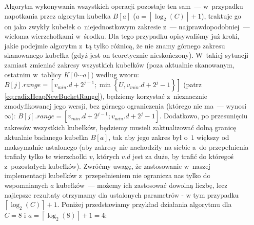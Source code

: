 Algorytm wykonywania wszystkich operacji pozostaje ten sam~--- w~przypadku napotkania przez algorytm kubełka $B \left[ a  \right]$ ($a = \left \lceil \log_{2} \left( C \right) \right \rceil + 1$), traktuje go on jako zwykły kubełek o~niejednostkowym zakresie z~--- najprawdopodobniej~--- wieloma wierzchołkami w~środku. Dla tego przypadku opisywaliśmy już kroki, jakie podejmie algorytm z~tą tylko różnicą, że nie znamy górnego zakresu skanowanego kubełka (gdyż jest on teoretycznie nieskończony). W~takiej sytuacji zamiast zmieniać zakresy wszystkich kubełków (poza aktualnie skanowanym, ostatnim w~tablicy $K \left[ 0 \cdots a \right]$) według wzoru: $B \left[ j \right].range = \left[ v_{min}.d + 2 ^{j-1} ; \min \left\{ U, v_{min}.d + 2^{j} - 1 \right\} \right]$ (patrz \ref{eq:radixHeapNewBucketRange}), będziemy korzystać z~nieznacznie zmodyfikowanej jego wersji, bez górnego ograniczenia (którego nie ma~--- wynosi $\infty$):  $B \left[ j \right].range = \left[ v_{min}.d + 2 ^{j-1} ; v_{min}.d + 2^{j} - 1 \right]$. Dodatkowo, po przesunięciu zakresów wszystkich kubełków, będziemy musieli zaktualizować dolną granicę aktualnie badanego kubełka $B \left[ a \right]$, tak aby jego zakres był o~$1$ większy od maksymalnie ustalonego (aby zakresy nie nachodziły na siebie a~do przepełnienia trafiały tylko te wierzchołki $v$, których $v.d$ jest za duże, by trafić do któregoś z~pozostałych kubełków). Zwróćmy uwagę, że zastosowanie w~naszej implementacji kubełków z~przepełnieniem nie ogranicza nas tylko do wspomnianych $a$ kubełków~--- możemy ich zastosować dowolną liczbę, lecz najlepsze rezultaty otrzymamy dla ustalonych parametrów - w tym przypadku $\left \lceil \log_{2} \left( C \right) \right \rceil + 1$. Poniżej przedstawiamy przykład działania algorytmu dla $C=8$ i $a = \left \lceil \log_{2} \left( 8 \right) \right \rceil + 1 = 4$:

